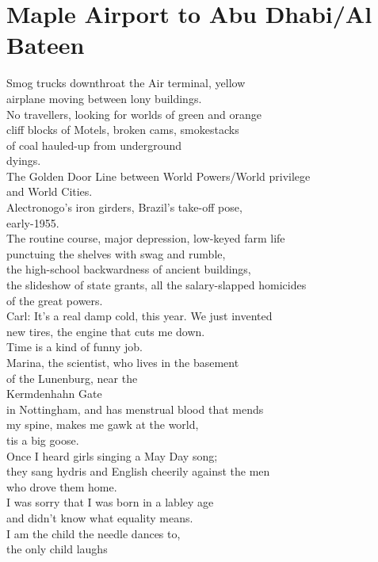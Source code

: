 \documentclass[smalldemyvopaper,11pt,twoside,onecolumn,openright,extrafontsizes]{memoir}
\begin{document}
\chapter{Maple Airport to Abu Dhabi/Al Bateen}
Smog trucks downthroat the Air terminal, yellow
\\airplane moving between lony buildings.
\\No travellers, looking for worlds of green and orange
\\cliff blocks of Motels, broken cams, smokestacks
\\of coal hauled-up from underground
\\dyings.
\\The Golden Door Line between World Powers/World privilege
\\and World Cities.
\\Alectronogo's iron girders, Brazil's take-off pose,
\\early-1955.
\\The routine course, major depression, low-keyed farm life
\\punctuing the shelves with swag and rumble,
\\the high-school backwardness of ancient buildings,
\\the slideshow of state grants, all the salary-slapped homicides
\\of the great powers.
\\Carl: It's a real damp cold, this year. We just invented
\\new tires, the engine that cuts me down.
\\Time is a kind of funny job.
\\Marina, the scientist, who lives in the basement
\\of the Lunenburg, near the
\\Kermdenhahn Gate
\\in Nottingham, and has menstrual blood that mends
\\my spine, makes me gawk at the world,
\\tis a big goose.
\\Once I heard girls singing a May Day song;
\\they sang hydris and English cheerily against the men
\\who drove them home.
\\I was sorry that I was born in a labley age
\\and didn't know what equality means.
\\I am the child the needle dances to,
\\the only child laughs
\end{document}
